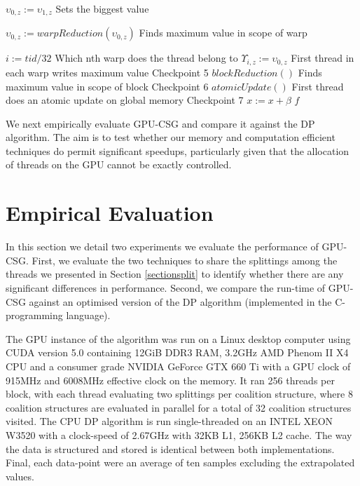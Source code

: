 \documentclass{llncs}
\begin{document}
\begin{algorithm*}[!t]
\begin{algorithmic}[1]
    \label{lst:line:checkif}
      \STATE $\upsilon_{0,z} := \upsilon_{1,z}$ \hfill Sets the biggest value
    \ENDIF
    
    \STATE $\upsilon_{0,z} := warpReduction(\upsilon_{0,z})$ \hfill Finds maximum value in scope of warp

      \STATE $i := tid / 32$ \hfill Which nth warp does the thread belong to
      \STATE $\Upsilon_{i,z} := \upsilon_{0,z}$ \hfill First thread in each warp writes maximum value
    \ENDIF
  \ENDFOR   \hfill Checkpoint 5
  \STATE $blockReduction()$\label{lst:line:blockReduction} \hfill Finds maximum value in scope of block
  \hfill Checkpoint 6
  \STATE $atomicUpdate()$\label{lst:line:reductionend} \hfill First thread does an atomic update on global memory
  \ENDIF  \hfill Checkpoint 7
  \STATE $x := x + \beta$
\ENDFOR
\RETURN $f$
\end{algorithmic}
\end{algorithm*}

We next empirically evaluate GPU-CSG and compare it against the DP algorithm. The aim is to test whether our memory and computation efficient techniques do permit significant speedups, particularly given that the allocation of threads on the GPU cannot be exactly controlled.

\section{Empirical Evaluation}
In this section we detail two experiments we evaluate the performance of GPU-CSG. First, we evaluate the two techniques to share the splittings among the threads we presented in Section \ref{sectionsplit} to identify whether there are any significant differences in performance. Second, we compare the run-time of GPU-CSG against an optimised version of the DP algorithm (implemented in the C-programming language).


The GPU instance of the algorithm was run on a Linux desktop computer using CUDA version 5.0 containing 12GiB DDR3 RAM,  3.2GHz AMD Phenom II X4 CPU and a consumer grade NVIDIA GeForce GTX 660 Ti with a GPU clock of 915MHz and 6008MHz effective clock on the memory.
It ran 256 threads per block, with each thread evaluating two splittings per coalition structure, 
where 8 coalition structures are evaluated in parallel for a total of 32 coalition structures visited.
The CPU DP algorithm is run single-threaded on an INTEL XEON W3520 with a clock-speed of 2.67GHz with 32KB L1, 256KB L2 cache.  The way the data is structured and stored is identical between both implementations. Final, each data-point were an average of ten samples excluding the extrapolated values. 
\end{document}
